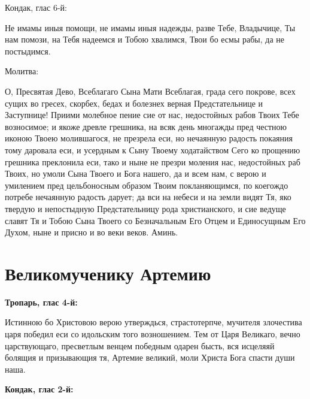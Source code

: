 \bfseries 

Кондак, глас 6-й:\normalfont{}


Не имамы иныя помощи, не имамы иныя надежды, разве Тебе, Владычице, Ты нам помози, на Тебя надеемся и Тобою хвалимся, Твои бо есмы рабы, да не постыдимся. 

\bfseries 

Молитва:\normalfont{}


О, Пресвятая Дево, Всеблагаго Сына Мати Всеблагая, града сего покрове, всех сущих во гресех, скорбех, бедах и болезнех верная Предстательнице и Заступнице! Приими молебное пение сие от нас, недостойных рабов Твоих Тебе возносимое; и якоже древле грешника, на всяк день многажды пред честною иконою Твоею молившагося, не презрела еси, но нечаянную радость покаяния тому даровала еси, и усердным к Сыну Твоему ходатайством Сего ко прощению грешника преклонила еси, тако и ныне не презри моления нас, недостойных раб Твоих, но умоли Сына Твоего и Бога нашего, да и всем нам, с верою и умилением пред цельбоносным образом Твоим покланяющимся, по коегождо потребе нечаянную радость дарует; да вси на небеси и на земли видят Тя, яко твердую и непостыдную Предстательницу рода христианского, и сие ведуще славят Тя и Тобою Сына Твоего со Безначальным Его Отцем и Единосущным Его Духом, ныне и присно и во веки веков. Аминь.





\bigskip\bigskip\mychapterending


 

\section{Великомученику Артемию}
 


\bfseries Тропарь, глас 4-й:\normalfont{}\nopagebreak


Истинною бо Христовою верою утверждься, страстотерпче, мучителя злочестива царя победил еси со идольским того возношением. Тем от Царя Великаго, вечно царствующаго, пресветлым венцем победным одарен бысть, вся исцеляяй болящия и призывающия тя, Артемие великий, моли Христа Бога спасти души наша.


\medskip


\bfseries Кондак, глас 2-й:\normalfont{}\nopagebreak


